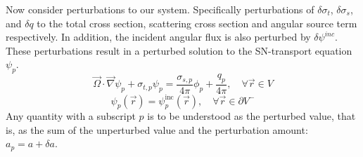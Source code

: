\documentclass[12pt]{report}
\newcommand{\vr}{\vec{r}}
\newcommand{\vO}{\vec{\Omega}}
\newcommand{\grad}{\vec{\nabla}}
\newcommand{\sigt}{\sigma_t}
\newcommand{\sigs}{\sigma_s}
\begin{document}
Now consider perturbations to our system. Specifically perturbations of $\delta \sigt$, $\delta \sigs$, and $\delta q$ to the total cross section, scattering cross section and angular source term respectively. In addition, the incident angular flux is also perturbed by $\delta \psi^{inc}$. These perturbations result in a perturbed solution to the SN-transport equation $\psi_p$. 
\begin{equation}
\label{snFwdPert}
\vO \cdot \grad \psi_p + \sigma_{t,p} \psi_p = \frac{\sigma_{s,p}}{4 \pi} \phi_p + \frac{q_p}{4\pi},  \quad \forall \vr \in V
\end{equation}
\begin{equation}
\psi_p(\vr) = \psi_p^{\text{inc}}(\vr), \quad \forall \vr \in \partial V^{-}
\end{equation}
Any quantity with a subscript $p$ is to be understood as the perturbed value, that is, as 
the sum of the unperturbed value and the perturbation amount: $a_p = a + \delta a$.
\end{document}
